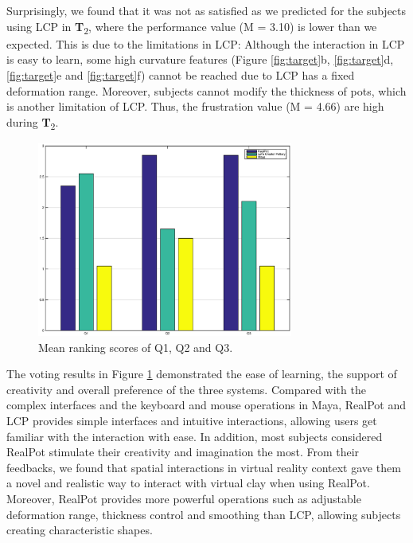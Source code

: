 \documentclass{svjour3}                     %
\begin{document}
Surprisingly, we found that it was not as satisfied as we predicted for the subjects using LCP in \textbf{T}\textsubscript{2}, where the performance value (M = 3.10) is lower than we expected. This is due to the limitations in LCP: Although the interaction in LCP is easy to learn, some high curvature features (Figure \ref{fig:target}b, \ref{fig:target}d, \ref{fig:target}e and \ref{fig:target}f) cannot be reached due to LCP has a fixed deformation range. Moreover, subjects cannot modify the thickness of pots, which is another limitation of LCP. Thus, the frustration value (M = 4.66) are high during \textbf{T}\textsubscript{2}.

\begin{figure}
	\includegraphics[width=0.75\textwidth]{fig15.eps}
	\caption{Mean ranking scores of Q1, Q2 and Q3.}
	\label{fig:ranking}
\end{figure}

The voting results in Figure \ref{fig:ranking} demonstrated the ease of learning, the support of creativity and overall preference of the three systems.
Compared with the complex interfaces and the keyboard and mouse operations in Maya, RealPot and LCP provides simple interfaces and intuitive interactions, allowing users get familiar with the interaction with ease.
In addition, most subjects considered RealPot stimulate their creativity and imagination the most. From their feedbacks, we found that spatial interactions in virtual reality context gave them a novel and realistic way to interact with virtual clay when using RealPot. Moreover, RealPot provides more powerful operations such as adjustable deformation range, thickness control and smoothing than LCP, allowing subjects creating characteristic shapes.
\end{document}
